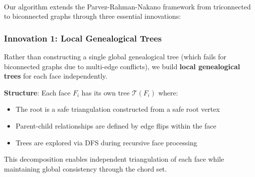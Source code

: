 ﻿﻿\documentclass[12pt,a4paper]{article}
\theoremstyle{definition}
\theoremstyle{remark}
\begin{document}
Our algorithm extends the Parvez-Rahman-Nakano framework from triconnected to biconnected graphs through three essential innovations:

\subsubsection{Innovation 1: Local Genealogical Trees}

Rather than constructing a single global genealogical tree (which fails for biconnected graphs due to multi-edge conflicts), we build \textbf{local genealogical trees} for each face independently.

\textbf{Structure}: Each face $F_i$ has its own tree $\mathcal{T}(F_i)$ where:
\begin{itemize}
	\item The root is a safe triangulation constructed from a safe root vertex
	\item Parent-child relationships are defined by edge flips within the face
	\item Trees are explored via DFS during recursive face processing
\end{itemize}

This decomposition enables independent triangulation of each face while maintaining global consistency through the chord set.

\end{document}
